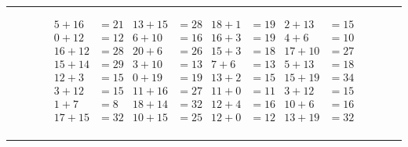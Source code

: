 \documentclass{article}
\begin{document}
\begin{sloppy}
\hrule
\begin{align*}
    {5} + {16} &= {21} & {13} + {15} &= {28} & {18} + {1} &= {19} & {2} + {13} &= {15} \\
    {0} + {12} &= {12} & {6} + {10} &= {16} & {16} + {3} &= {19} & {4} + {6} &= {10} \\
    {16} + {12} &= {28} & {20} + {6} &= {26} & {15} + {3} &= {18} & {17} + {10} &= {27} \\
    {15} + {14} &= {29} & {3} + {10} &= {13} & {7} + {6} &= {13} & {5} + {13} &= {18} \\
    {12} + {3} &= {15} & {0} + {19} &= {19} & {13} + {2} &= {15} & {15} + {19} &= {34} \\
    {3} + {12} &= {15} & {11} + {16} &= {27} & {11} + {0} &= {11} & {3} + {12} &= {15} \\
    {1} + {7} &= {8} & {18} + {14} &= {32} & {12} + {4} &= {16} & {10} + {6} &= {16} \\
    {17} + {15} &= {32} & {10} + {15} &= {25} & {12} + {0} &= {12} & {13} + {19} &= {32} \\
\end{align*}
\hrule
\end{sloppy}
\end{document}
